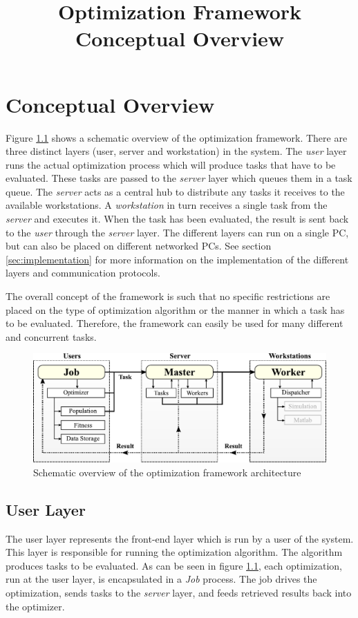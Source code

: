 \documentclass{report}
\title{Optimization Framework Conceptual Overview}
\begin{document}
\maketitle

\tableofcontents

\chapter{Conceptual Overview}
Figure \ref{fig:overview} shows a schematic overview of the optimization
framework. There are three distinct layers (user, server and workstation)
in the system. The \textit{user} layer runs the actual optimization process
which will produce tasks that have to be evaluated. These tasks are passed
to the \textit{server} layer which queues them in a task queue. The
\textit{server} acts as a central hub to distribute any tasks it receives
to the available workstations. A \textit{workstation} in turn receives a
single task from the \textit{server} and executes it. When the task has been
evaluated, the result is sent back to the \textit{user} through the
\textit{server} layer. The different layers can run on a single PC, but can
also be placed on different networked PCs. See section \ref{sec:implementation}
for more information on the implementation of the different layers and
communication protocols.

The overall concept of the framework is such that no specific
restrictions are placed on the type of optimization algorithm or the manner
in which a task has to be evaluated. Therefore, the framework can easily be
used for many different and concurrent tasks.

\begin{figure}[h!tb]
	\centering
	\includegraphics[width=\textwidth]{images/overview}
	\caption{Schematic overview of the optimization framework architecture}
	\label{fig:overview}
\end{figure}

\section{User Layer}
The user layer represents the front-end layer which is run by a user of the
system. This layer is responsible for running the optimization algorithm. The
algorithm produces tasks to be evaluated. As can be seen in figure
\ref{fig:overview}, each optimization, run at the user layer, is encapsulated
in a \textit{Job} process. The job drives the optimization, sends tasks
to the \textit{server} layer, and feeds retrieved results back into the
optimizer.
\end{document}
